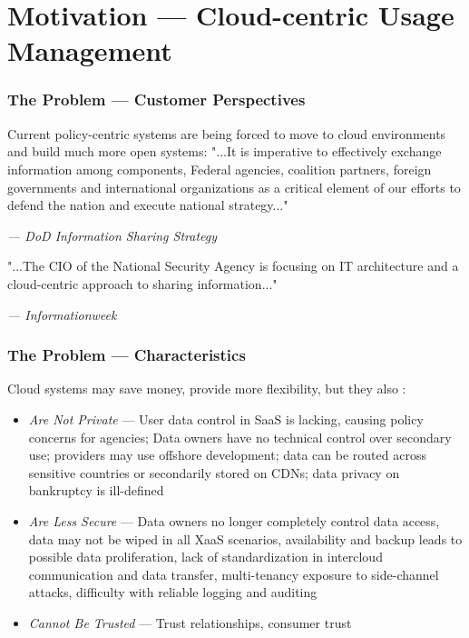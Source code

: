 \section{Motivation --- Cloud-centric Usage Management}


\begin{frame}
\frametitle{The Problem --- Customer Perspectives}
Current policy-centric systems are being forced to move to cloud environments and build much more open systems:
\newline
\newline
\newline
"...It is imperative to  effectively exchange information among components, Federal agencies, coalition partners, foreign governments and international organizations as a critical element of our efforts to defend the nation and execute national strategy..."\cite{proposal:info-sharing-strategy}
\newline
\begin{footnotesize}\textit{--- DoD Information Sharing Strategy}\end{footnotesize}
\newline
\newline
\newline
"...The CIO of the National Security Agency is focusing on IT architecture and a cloud-centric approach to sharing information..."\cite{proposal:nsa-cloud}
\newline
\begin{footnotesize}\textit{--- Informationweek}\end{footnotesize}
\end{frame}

\begin{frame}
\frametitle{The Problem --- Characteristics}
Cloud systems may save money, provide more flexibility, but they also \cite{proposal:privacy-security-trust-cloud}:
\begin{itemize}
\item<2-> \textit{Are Not Private} --- User data control in SaaS is lacking, causing policy concerns for agencies; Data owners have no technical control over secondary use; providers may use offshore development; data can be routed across sensitive countries or secondarily stored on CDNs; data privacy on bankruptcy is ill-defined
\item<3-> \textit{Are Less Secure} --- Data owners no longer completely control data access, data may not be wiped in all XaaS scenarios, availability and backup leads to possible data proliferation, lack of standardization in intercloud communication and data transfer, multi-tenancy exposure to side-channel attacks, difficulty with reliable logging and auditing
\item<4-> \textit{Cannot Be Trusted} --- Trust relationships, consumer trust
\end{itemize}
\end{frame}

